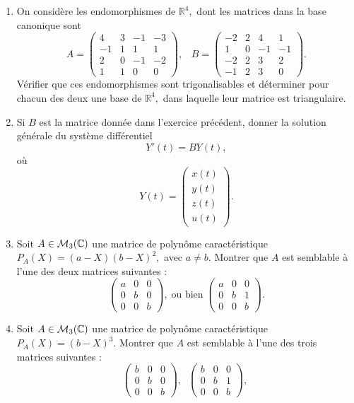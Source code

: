 \documentclass[12pt,a4paper]{article}
\begin{document}
\begin{enumerate}
\item On considère  les endomorphismes de $\mathbb R^4,$ dont les
  matrices dans la base  canonique sont
$$
A=\left(\begin{array}{rrrr}4&3&-1&-3\\-1&1&1&1\\2&0&-1&-2\\1&1&0&0\end{array}\right),\;\;\;B=\left(\begin{array}{rrrr}-2&2&4&1\\1&0&-1&-1\\-2&2&3&2\\-1&2&3&0\end{array}\right).$$
Vérifier que ces endomorphismes sont trigonalisables et déterminer
pour chacun des deux une base de $\mathbb R^4,$ dans laquelle leur
matrice est triangulaire.
\item Si $B$ est la matrice donnée dans l'exercice précédent, donner
  la solution générale du système différentiel $$ Y'(t)=BY(t),$$ où
$$Y(t)=\left(\begin{array}{cccc}x(t)\\y(t)\\z(t)\\u(t)\end{array}\right).$$
\item Soit $A\in {\cal M}_3(\mathbb C)$ une matrice de polynôme
  caractéristique $P_A(X)=(a-X)(b-X)^2,$ avec $a\neq b.$ Montrer que $A$ est semblable
  à l'une des deux matrices suivantes :
$$\left(\begin{array}{ccc}a&0&0\\0&b&0\\0&0&b\end{array}\right),\;\mbox{
  ou bien}\;
\left(\begin{array}{ccc}a&0&0\\0&b&1\\0&0&b\end{array}\right).$$
\item Soit $A\in {\cal M}_3(\mathbb C)$ une matrice de polynôme
  caractéristique $P_A(X)=(b-X)^3.$ Montrer que $A$ est semblable
  à l'une des trois matrices suivantes :
$$\left(\begin{array}{ccc}b&0&0\\0&b&0\\0&0&b\end{array}\right),\;\;
\left(\begin{array}{ccc}b&0&0\\0&b&1\\0&0&b\end{array}\right),\;\mbox{
}$$
\end{enumerate}
\end{document}
